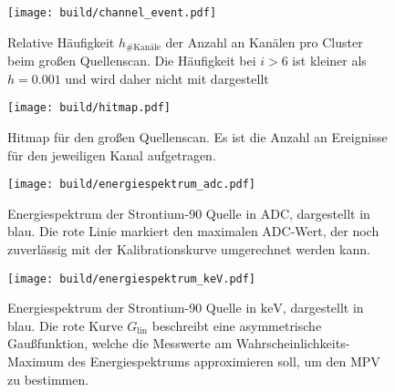 \begin{figure}
  \centering
  \texttt{[image: build/channel\_event.pdf]}
  \caption{Relative Häufigkeit $h_{\#\text{Kanäle}}$ der Anzahl an Kanälen pro Cluster beim großen Quellenscan. Die Häufigkeit bei $i > 6$ ist kleiner als $h = 0.001$ und wird daher nicht mit dargestellt}
  \label{fig:channelevent}
\end{figure}

\begin{figure}
  \centering
  \texttt{[image: build/hitmap.pdf]}
  \caption{Hitmap für den großen Quellenscan. Es ist die Anzahl an Ereignisse für den jeweiligen Kanal aufgetragen.}
  \label{fig:hitmap}
\end{figure}

\begin{figure}
  \centering
  \texttt{[image: build/energiespektrum\_adc.pdf]}
  \caption{Energiespektrum der Strontium-90 Quelle in ADC, dargestellt in blau. Die rote Linie markiert den maximalen ADC-Wert, der noch zuverlässig mit der Kalibrationskurve umgerechnet werden kann.}
  \label{fig:energieadc}
\end{figure}

\begin{figure}
  \centering
  \texttt{[image: build/energiespektrum\_keV.pdf]}
  \caption{Energiespektrum der Strontium-90 Quelle in $\si{\kilo\electronvolt}$, dargestellt in blau. Die rote Kurve $G_\text{lin}$ beschreibt eine asymmetrische Gaußfunktion, welche die Messwerte am Wahrscheinlichkeits-Maximum des
  Energiespektrums approximieren soll, um den MPV zu bestimmen.}
  \label{fig:energiekeV}
\end{figure}

